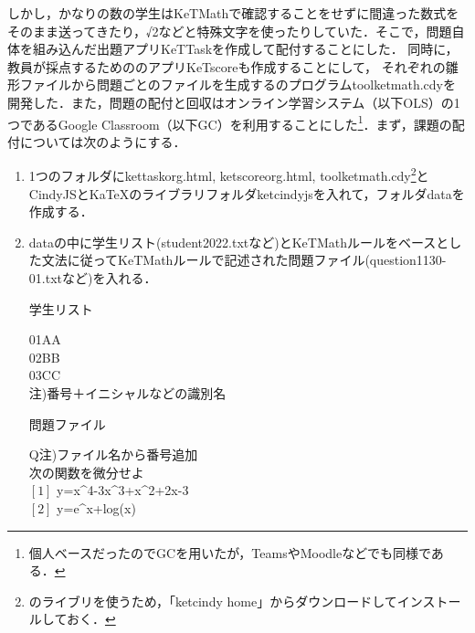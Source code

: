 \documentclass[a4j,12pt]{ujarticle}
\begin{document}
しかし，かなりの数の学生はKeTMathで確認することをせずに間違った数式をそのまま送ってきたり，√2などと特殊文字を使ったりしていた．そこで，問題自体を組み込んだ出題アプリKeTTaskを作成して配付することにした．%
同時に，教員が採点するためののアプリKeTscoreも作成することにして，%
それぞれの雛形ファイルから問題ごとのファイルを生成する\ketcindy のプログラムtoolketmath.cdyを開発した．また，問題の配付と回収はオンライン学習システム（以下OLS）の1つであるGoogle Classroom（以下GC）を利用することにした\footnote{個人ベースだったのでGCを用いたが，TeamsやMoodleなどでも同様である．}．まず，課題の配付については次のようにする．\vspace{-1mm}
\begin{enumerate}
\item 1つのフォルダにkettaskorg.html, ketscoreorg.html, toolketmath.cdy\footnote{\ketcindy のライブリを使うため，「ketcindy home」からダウンロードしてインストールしておく．}とCindyJSとKaTeXのライブラリフォルダketcindyjsを入れて，フォルダdataを作成する．\vspace{-2mm}
\item dataの中に学生リスト(student2022.txtなど)とKeTMathルールをベースとした文法に従ってKeTMathルールで記述された問題ファイル(question1130-01.txtなど)を入れる．\\
\begin{minipage}[t]{68mm}
\begin{center}
学生リスト
\end{center}
\hspace*{2zw}01AA\\
\hspace*{2zw}02BB\\
\hspace*{2zw}03CC\\
\hfill{\small 注)番号＋イニシャルなどの識別名}
\end{minipage}\hspace{6mm}%
\begin{minipage}[t]{68mm}
\begin{center}
問題ファイル
\end{center}
\hspace*{2zw}Q\hfill{\small 注)ファイル名から番号追加}\\
\hspace*{2zw}次の関数を微分せよ\\
\hspace*{2zw}$[1]$ y=x\^{}4-3x\^{}3+x\^{}2+2x-3\\
\hspace*{2zw}$[2]$ y=e{}\^{}x+log(x)\\

\end{minipage}
\end{enumerate}
\end{document}

